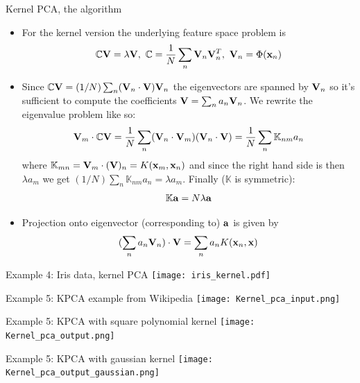 \documentclass[handout]{beamer}   %
\def\C{\mathbb{C}}
\def\K{\mathbb{K}}
\def\b#1{{\bf #1}}
\begin{document}
\begin{frame}{Kernel PCA, the algorithm}
  \begin{itemize}[<+->]
    \item For the kernel version the underlying feature space problem is
      $$ \C{\b V}=\lambda{\b V}, \ \C={1\over N}\sum_n{\b V}_n{\b V}_n^T, \ {\b V}_n=\Phi({\b x}_n) $$
    \item Since $\C{\b V}=(1/N)\sum_n({\b V}_n\cdot{\b V}){\b V}_n$ the eigenvectors are spanned by ${\b V}_n$
      so it's sufficient to compute the coefficients ${\b V}=\sum_na_n{\b V}_n$. We rewrite the eigenvalue problem
      like so:
      $$ {\b V}_m\cdot\C{\b V} = {1\over N}\sum_n({\b V}_n\cdot{\b V}_m)({\b V}_n\cdot{\b V})
      = {1\over N}\sum_n \K_{nm}a_n $$
      where $\K_{mn}={\b V}_m\cdot(\b V)_n=K({\b x}_m, {\b x}_n)$ and since the right hand side is then
      $\lambda a_m$ we get $(1/N)\sum_n \K_{nm}a_n=\lambda a_m$. Finally ($\K$ is symmetric):
      $$ \K{\b a}=N\lambda {\b a} $$
    \item Projection onto eigenvector (corresponding to) ${\b a}$ is given by
      $$ (\sum_n a_n{\b V}_n)\cdot{\b V} = \sum_n a_nK({\b x}_n,{\b x}) $$
  \end{itemize}
\end{frame}


\begin{frame}{Example 4: Iris data, kernel PCA}
  \texttt{[image: iris\_kernel.pdf]}
\end{frame}


\begin{frame}{Example 5: KPCA example from Wikipedia}
  \texttt{[image: Kernel\_pca\_input.png]}
\end{frame}
\begin{frame}{Example 5: KPCA with square polynomial kernel}
  \texttt{[image: Kernel\_pca\_output.png]}
\end{frame}
\begin{frame}{Example 5: KPCA with gaussian kernel}
  \texttt{[image: Kernel\_pca\_output\_gaussian.png]}
\end{frame}
\end{document}
